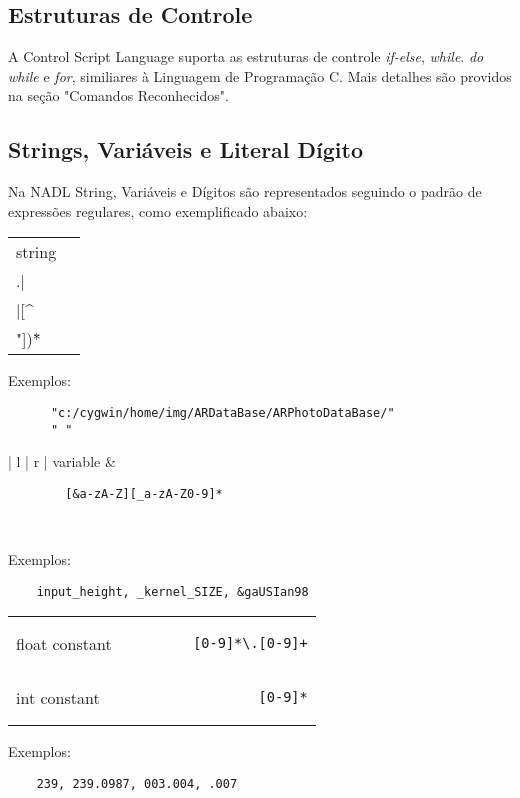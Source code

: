 \documentclass[a4paper,10pt]{article}
\begin{document}
  
  \subsection{Estruturas de Controle}
  A Control Script Language suporta as estruturas de controle \emph{if-else}, \emph{while}. \emph{do while} e \emph{for}, similiares \`a Linguagem de Programa\c{c}\~ao C. Mais detalhes s\~ao providos na se\c{c}\~ao
  "Comandos Reconhecidos".
  
  \subsection{Strings, Vari\'aveis e Literal D\'igito}
  Na NADL String, Vari\'aveis e D\'igitos s\~ao representados seguindo o padr\~ao de express\~oes regulares, como exemplificado abaixo:
    \begin{center}
      \begin{tabular}{| l | r |}
      \hline
	    string & \begin{lstlisting}
	    \"(\\.|\\\n|[^\\"])*\"
	    \end{lstlisting} \\
      \hline
      \end{tabular}
    \end{center}
    Exemplos:
    \begin{lstlisting}
      "c:/cygwin/home/img/ARDataBase/ARPhotoDataBase/"
      " " 
    \end{lstlisting}

    \begin{center}
      \begin{tabular}{| l | r |}
      \hline
	    variable & \begin{lstlisting}
	    [&a-zA-Z][_a-zA-Z0-9]*
	    \end{lstlisting}\\
      \hline
      \end{tabular}
    \end{center}
    Exemplos:
    \begin{lstlisting}
    input_height, _kernel_SIZE, &gaUSIan98
    \end{lstlisting}

    \begin{center}
      \begin{tabular}{| l | r |}
      \hline
	    float constant & \begin{lstlisting}
	    [0-9]*\.[0-9]+
	    \end{lstlisting}\\
	    int constant & \begin{lstlisting}
	    [0-9]*
	    \end{lstlisting}\\
      \hline
      \end{tabular}
    \end{center}
    Exemplos:
    \begin{lstlisting}
    239, 239.0987, 003.004, .007
    \end{lstlisting}
\end{document}
